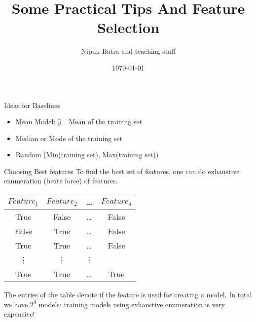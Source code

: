 \documentclass{beamer}
\title{Some Practical Tips And Feature Selection}
\date{\today}
\author{Nipun Batra and teaching staff}
\institute{IIT Gandhinagar}
\begin{document}
  \maketitle
  
  
  


\begin{frame}{Ideas for Baselines}
    
    
    \begin{itemize}[<+->]
        \item Mean Model: $\hat{y}$= Mean of the training set
        \item Median or Mode of the training set
        \item Random (Min(training set), Max(training set))
    \end{itemize}
\end{frame}


\begin{frame}{Choosing Best features}
    To find the best set of features, one can do exhaustive enumeration (brute force) of features.    
    
    \pause \begin{tabular}{c|c|c|c}
        $Feature_{1}$ & $Feature_{2}$ &\dots & $Feature_{d}$  \\
        \hline
      
         True  & False &  \dots & False\\
         False &  True & \dots & False\\ 
         True &  True & \dots & False\\ 
         \vdots &  \vdots & \vdots&\\
         True & True &\dots & True\\ 
         \hline 
         
    \end{tabular}
    
    \pause The entries of the table denote if the feature is used for creating a model. In total we have $2^{d}$ models: training models using exhaustive enumeration is very expensive!
\end{frame}
\end{document}
